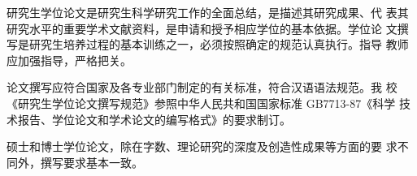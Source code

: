 \begin{cabstract}

\linespread{1.08}\selectfont

研究生学位论文是研究生科学研究工作的全面总结，是描述其研究成果、代 表其研究水平的重要学术文献资料，是申请和授予相应学位的基本依据。学位论 文撰写是研究生培养过程的基本训练之一，必须按照确定的规范认真执行。指导 教师应加强指导，严格把关。

论文撰写应符合国家及各专业部门制定的有关标准，符合汉语语法规范。我 校《研究生学位论文撰写规范》参照中华人民共和国国家标准 GB7713-87《科学 技术报告、学位论文和学术论文的编写格式》的要求制订。

硕士和博士学位论文，除在字数、理论研究的深度及创造性成果等方面的要 求不同外，撰写要求基本一致。


\end{cabstract}
